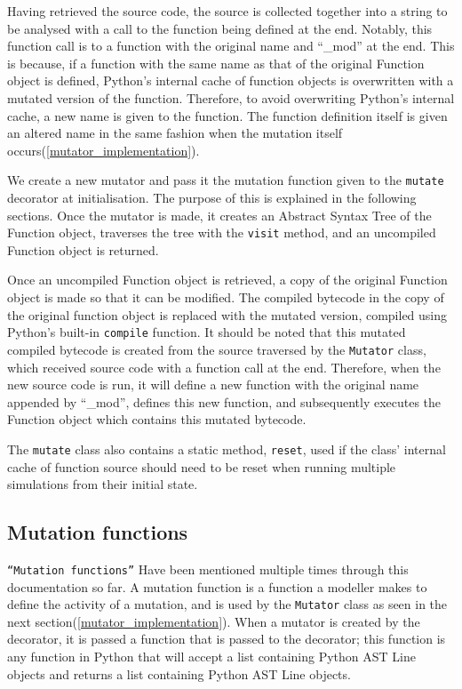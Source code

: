 Having retrieved the source code, the source is collected together into a string to be analysed with a call to the function being defined at the end. Notably, this function call is to a function with the original name and ``\_mod'' at the end. This is because, if a function with the same name as that of the original Function object is defined, Python's internal cache of function objects is overwritten with a mutated version of the function. Therefore, to avoid overwriting Python's internal cache, a new name is given to the function. The function definition itself is given an altered name in the same fashion when the mutation itself occurs(\cref{mutator_implementation}). \par

We create a new mutator and pass it the mutation function given to the \texttt{mutate} decorator at initialisation. The purpose of this is explained in the following sections. Once the mutator is made, it creates an Abstract Syntax Tree of the Function object, traverses the tree with the \texttt{visit} method, and an uncompiled Function object is returned. \par

Once an uncompiled Function object is retrieved, a copy of the original Function object is made so that it can be modified. The compiled bytecode in the copy of the original function object is replaced with the mutated version, compiled using Python's built-in \texttt{compile} function. It should be noted that this mutated compiled bytecode is created from the source traversed by the \texttt{Mutator} class, which received source code with a function call at the end. Therefore, when the new source code is run, it will define a new function with the original name appended by ``\_mod'', defines this new function, and subsequently executes the Function object which contains this mutated bytecode. \par

The \texttt{mutate} class also contains a static method, \texttt{reset}, used if the class' internal cache of function source should need to be reset when running multiple simulations from their initial state. \par

\subsection{Mutation functions}
\label{mutation_function_explanation}
\texttt{``Mutation functions''} Have been mentioned multiple times through this documentation so far. A mutation function is a function a modeller makes to define the activity of a mutation, and is used by the \texttt{Mutator} class as seen in the next section(\cref{mutator_implementation}). When a mutator is created by the decorator, it is passed a function that is passed to the decorator; this function is any function in Python that will accept a list containing Python AST Line objects and returns a list containing Python AST Line objects. \par

